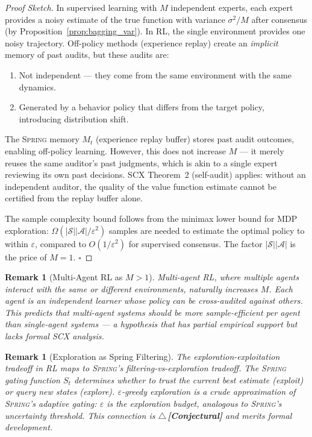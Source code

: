 \documentclass[12pt,a4paper]{article}
\newtheorem{remark}[theorem]{Remark}
\theoremstyle{definition}
\newcommand{\rigorConjectural}{{\color{red!70!black}$\triangle$\,\textbf{[Conjectural]}}}
\newcommand{\Spring}{\textsc{Spring}}
\newcommand{\SCX}{\textsc{SCX}}
\newcommand{\cA}{\mathcal{A}}
\newcommand{\cS}{\mathcal{S}}
\begin{document}
\begin{proof}[Proof Sketch]
In supervised learning with $M$ independent experts, each expert provides a noisy estimate of the true function with variance $\sigma^2/M$ after consensus (by Proposition~\ref{prop:bagging_var}). In RL, the single environment provides one noisy trajectory. Off-policy methods (experience replay) create an \emph{implicit} memory of past audits, but these audits are:
\begin{enumerate}[nosep]
    \item Not independent — they come from the same environment with the same dynamics.
    \item Generated by a behavior policy that differs from the target policy, introducing distribution shift.
\end{enumerate}

The \Spring{} memory $M_t$ (experience replay buffer) stores past audit outcomes, enabling off-policy learning. However, this does not increase $M$ — it merely reuses the same auditor's past judgments, which is akin to a single expert reviewing its own past decisions. \SCX{} Theorem~2 (self-audit) applies: without an independent auditor, the quality of the value function estimate cannot be certified from the replay buffer alone.

The sample complexity bound follows from the minimax lower bound for MDP exploration: $\Omega(|\cS||\cA|/\varepsilon^2)$ samples are needed to estimate the optimal policy to within $\varepsilon$, compared to $O(1/\varepsilon^2)$ for supervised consensus. The factor $|\cS||\cA|$ is the price of $M=1$. \hfill $\square$
\end{proof}

\begin{remark}[Multi-Agent RL as $M>1$]
Multi-agent RL, where multiple agents interact with the same or different environments, naturally increases $M$. Each agent is an independent learner whose policy can be cross-audited against others. This predicts that multi-agent systems should be more sample-efficient per agent than single-agent systems — a hypothesis that has partial empirical support but lacks formal \SCX{} analysis.
\end{remark}

\begin{remark}[Exploration as Spring Filtering]
The exploration-exploitation tradeoff in RL maps to \Spring{}'s filtering-vs-exploration tradeoff. The \Spring{} gating function $S_t$ determines whether to trust the current best estimate (exploit) or query new states (explore). $\varepsilon$-greedy exploration is a crude approximation of \Spring{}'s adaptive gating: $\varepsilon$ is the exploration budget, analogous to \Spring{}'s uncertainty threshold. This connection is \rigorConjectural{} and merits formal development.
\end{remark}
\end{document}
